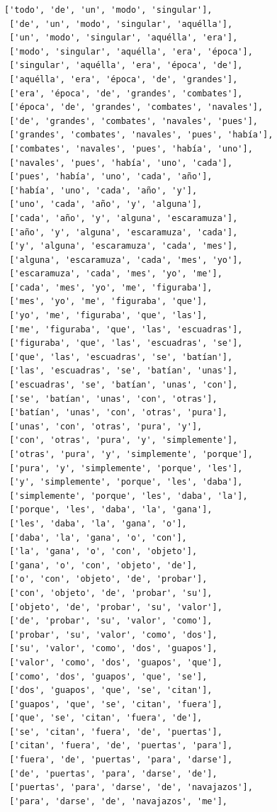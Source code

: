 \documentclass[11pt]{article}
\begin{document}
\begin{tcolorbox}[breakable, size=fbox, boxrule=1pt, pad at break*=1mm,colback=cellbackground, colframe=cellborder]
\begin{Verbatim}[commandchars=\\\{\}]
 ['todo', 'de', 'un', 'modo', 'singular'],
 ['de', 'un', 'modo', 'singular', 'aquélla'],
 ['un', 'modo', 'singular', 'aquélla', 'era'],
 ['modo', 'singular', 'aquélla', 'era', 'época'],
 ['singular', 'aquélla', 'era', 'época', 'de'],
 ['aquélla', 'era', 'época', 'de', 'grandes'],
 ['era', 'época', 'de', 'grandes', 'combates'],
 ['época', 'de', 'grandes', 'combates', 'navales'],
 ['de', 'grandes', 'combates', 'navales', 'pues'],
 ['grandes', 'combates', 'navales', 'pues', 'había'],
 ['combates', 'navales', 'pues', 'había', 'uno'],
 ['navales', 'pues', 'había', 'uno', 'cada'],
 ['pues', 'había', 'uno', 'cada', 'año'],
 ['había', 'uno', 'cada', 'año', 'y'],
 ['uno', 'cada', 'año', 'y', 'alguna'],
 ['cada', 'año', 'y', 'alguna', 'escaramuza'],
 ['año', 'y', 'alguna', 'escaramuza', 'cada'],
 ['y', 'alguna', 'escaramuza', 'cada', 'mes'],
 ['alguna', 'escaramuza', 'cada', 'mes', 'yo'],
 ['escaramuza', 'cada', 'mes', 'yo', 'me'],
 ['cada', 'mes', 'yo', 'me', 'figuraba'],
 ['mes', 'yo', 'me', 'figuraba', 'que'],
 ['yo', 'me', 'figuraba', 'que', 'las'],
 ['me', 'figuraba', 'que', 'las', 'escuadras'],
 ['figuraba', 'que', 'las', 'escuadras', 'se'],
 ['que', 'las', 'escuadras', 'se', 'batían'],
 ['las', 'escuadras', 'se', 'batían', 'unas'],
 ['escuadras', 'se', 'batían', 'unas', 'con'],
 ['se', 'batían', 'unas', 'con', 'otras'],
 ['batían', 'unas', 'con', 'otras', 'pura'],
 ['unas', 'con', 'otras', 'pura', 'y'],
 ['con', 'otras', 'pura', 'y', 'simplemente'],
 ['otras', 'pura', 'y', 'simplemente', 'porque'],
 ['pura', 'y', 'simplemente', 'porque', 'les'],
 ['y', 'simplemente', 'porque', 'les', 'daba'],
 ['simplemente', 'porque', 'les', 'daba', 'la'],
 ['porque', 'les', 'daba', 'la', 'gana'],
 ['les', 'daba', 'la', 'gana', 'o'],
 ['daba', 'la', 'gana', 'o', 'con'],
 ['la', 'gana', 'o', 'con', 'objeto'],
 ['gana', 'o', 'con', 'objeto', 'de'],
 ['o', 'con', 'objeto', 'de', 'probar'],
 ['con', 'objeto', 'de', 'probar', 'su'],
 ['objeto', 'de', 'probar', 'su', 'valor'],
 ['de', 'probar', 'su', 'valor', 'como'],
 ['probar', 'su', 'valor', 'como', 'dos'],
 ['su', 'valor', 'como', 'dos', 'guapos'],
 ['valor', 'como', 'dos', 'guapos', 'que'],
 ['como', 'dos', 'guapos', 'que', 'se'],
 ['dos', 'guapos', 'que', 'se', 'citan'],
 ['guapos', 'que', 'se', 'citan', 'fuera'],
 ['que', 'se', 'citan', 'fuera', 'de'],
 ['se', 'citan', 'fuera', 'de', 'puertas'],
 ['citan', 'fuera', 'de', 'puertas', 'para'],
 ['fuera', 'de', 'puertas', 'para', 'darse'],
 ['de', 'puertas', 'para', 'darse', 'de'],
 ['puertas', 'para', 'darse', 'de', 'navajazos'],
 ['para', 'darse', 'de', 'navajazos', 'me'],

\end{Verbatim}
\end{tcolorbox}
\end{document}
